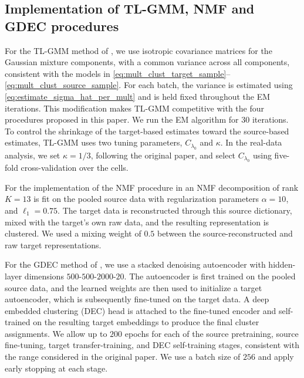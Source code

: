 \documentclass[10pt]{article}
\begin{document}
\subsection{Implementation of TL-GMM, NMF and GDEC procedures}
\label{sec:comparator_methods}
For the TL-GMM method of \cite{tian2025robust}, we use isotropic covariance matrices for the Gaussian mixture components, with a common variance across all components, consistent with the models in \eqref{eq:mult_clust_target_sample}--\eqref{eq:mult_clust_source_sample}. For each batch, the variance is estimated using \eqref{eq:estimate_sigma_hat_per_mult} and is held fixed throughout the EM iterations. This modification makes TL-GMM competitive with the four procedures proposed in this paper. We run the EM algorithm for $30$ iterations. To control the shrinkage of the target-based estimates toward the source-based estimates, TL-GMM uses two tuning parameters, $C_{\lambda_0}$ and $\kappa$. In the real-data analysis, we set $\kappa=1/3$, following the original paper, and select $C_{\lambda_0}$ using five-fold cross-validation over the cells.

For the implementation of the NMF procedure in \cite{nmf_paper} an NMF decomposition of rank $K=13$ is fit on the pooled source data with regularization parameters $\alpha = 10$, and $\ell_1 = 0.75$. The target data is reconstructed through this source dictionary, mixed with the target's own raw data, and the resulting representation is clustered. We used a mixing weight of $0.5$ between the source-reconstructed and raw target representations. 

For the GDEC method of \cite{gdec_paper}, we use a stacked denoising autoencoder with hidden-layer dimensions $500$-$500$-$2000$-$20$. The autoencoder is first trained on the pooled source data, and the learned weights are then used to initialize a target autoencoder, which is subsequently fine-tuned on the target data. A deep embedded clustering (DEC) head is attached to the fine-tuned encoder and self-trained on the resulting target embeddings to produce the final cluster assignments. We allow up to $200$ epochs for each of the source pretraining, source fine-tuning, target transfer-training, and DEC self-training stages, consistent with the range considered in the original paper. We use a batch size of $256$ and apply early stopping at each stage.
\end{document}
